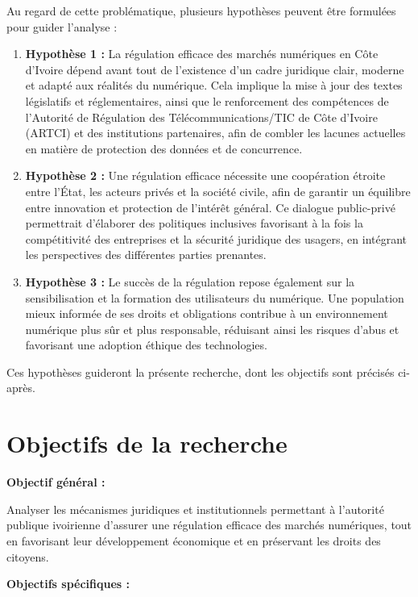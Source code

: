 Au regard de cette problématique, plusieurs hypothèses peuvent être formulées pour guider l'analyse :

\begin{enumerate}
\item \textbf{Hypothèse 1 :} La régulation efficace des marchés numériques en Côte d'Ivoire dépend avant tout de l'existence d'un cadre juridique clair, moderne et adapté aux réalités du numérique. Cela implique la mise à jour des textes législatifs et réglementaires, ainsi que le renforcement des compétences de l'Autorité de Régulation des Télécommunications/TIC de Côte d'Ivoire (ARTCI) et des institutions partenaires, afin de combler les lacunes actuelles en matière de protection des données et de concurrence.

\item \textbf{Hypothèse 2 :} Une régulation efficace nécessite une coopération étroite entre l'État, les acteurs privés et la société civile, afin de garantir un équilibre entre innovation et protection de l'intérêt général. Ce dialogue public-privé permettrait d'élaborer des politiques inclusives favorisant à la fois la compétitivité des entreprises et la sécurité juridique des usagers, en intégrant les perspectives des différentes parties prenantes.

\item \textbf{Hypothèse 3 :} Le succès de la régulation repose également sur la sensibilisation et la formation des utilisateurs du numérique. Une population mieux informée de ses droits et obligations contribue à un environnement numérique plus sûr et plus responsable, réduisant ainsi les risques d'abus et favorisant une adoption éthique des technologies.
\end{enumerate}

Ces hypothèses guideront la présente recherche, dont les objectifs sont précisés ci-après.

\section*{Objectifs de la recherche}

\textbf{Objectif général :}

Analyser les mécanismes juridiques et institutionnels permettant à l'autorité publique ivoirienne d'assurer une régulation efficace des marchés numériques, tout en favorisant leur développement économique et en préservant les droits des citoyens.

\textbf{Objectifs spécifiques :}

